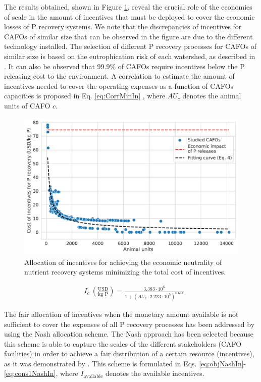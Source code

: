 \begin{refsection}[referencesCh5]
The results obtained, shown in Figure \ref{fig:MinIncent}, reveal the crucial role of the economies of scale in the amount of incentives that must be deployed to cover the economic losses of P recovery systems. We note that the discrepancies of incentives for CAFOs of similar size that can be observed in the figure are due to the different technology installed. The selection of different P recovery processes for CAFOs of similar size is based on the eutrophication risk of each watershed, 
as described in \citet{Tool}.
It can also be observed that 99.9\% of CAFOs require incentives below the P releasing cost to the environment. A correlation to estimate the amount of incentives needed to cover the operating expenses as a function of CAFOs capacities is proposed in Eq. \ref{eq:CorrMinIn} , where $AU_{c}$ denotes the animal units of CAFO $c$.

\begin{figure}[h!]
	\centering
	\includegraphics[width=0.9\linewidth, trim=0cm 0cm 0cm 0cm, clip]{gfx/Chapter5/MinIncentClean.pdf}
	\caption{Allocation of incentives for achieving the economic neutrality of nutrient recovery systems minimizing the total cost of incentives.}
	\label{fig:MinIncent}
\end{figure}

\begin{align}
& I_{c} \ \left(\frac{\text{USD}}{\text{kg P}}\right) = \frac{3.383 \cdot 10^6}{1+\left(AU_{c} \cdot 2.223\cdot 10^5 \right)^{0.647}} \label{eq:CorrMinIn} 
\end{align}

The fair allocation of incentives when the monetary amount available is not sufficient to cover the expenses of all P recovery processes has been addressed by using the Nash allocation scheme. The Nash approach has been selected because this scheme is able to capture the scales of the different stakeholders (CAFO facilities) in order to achieve a fair distribution of a certain resource (incentives), as it was demonstrated by \citet{sampat2019fairness}. This scheme is formulated in Eqs. \ref{eq:objNashIn}-\ref{eq:cons1NashIn}, where $I_{\text{available}}$ denotes the available incentives.


\end{refsection}
